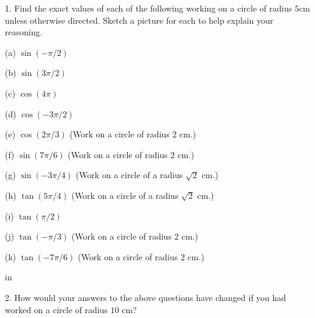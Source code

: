 \documentclass{ximera}
\newcommand{\pskip}{\vskip 0.1 in}
\begin{document}
\begin{question}  \label{Q346fr:Cosine}
1. Find the exact values of each of the following working on a circle of radius $5$cm unless otherwise directed. Sketch a picture for each to help explain your reasoning. 

(a) $\sin (-\pi/2)$

(b) $\sin(3\pi/2)$

(c) $\cos(4\pi)$

(d) $\cos(-3\pi/2)$

(e) $\cos (2\pi/3)$  (Work on a circle of radius $2$ cm.)

(f) $\sin(7\pi/6)$   (Work on a circle of radius $2$ cm.)

(g) $\sin(-3\pi/4)$   (Work on a circle of a radius $\sqrt{2}$ cm.)

(h) $\tan(5\pi/4)$  (Work on a circle of a radius $\sqrt{2}$ cm.)

(i) $\tan(\pi/2)$

(j) $\tan(-\pi/3)$ (Work on a circle of radius $2$ cm.)

(k) $\tan(-7\pi/6)$ (Work on a circle of radius $2$ cm.)

\pskip

2. How would your answers to the above questions have changed if you had worked on a circle of radius $10$ cm?

\end{question}
\end{document}
